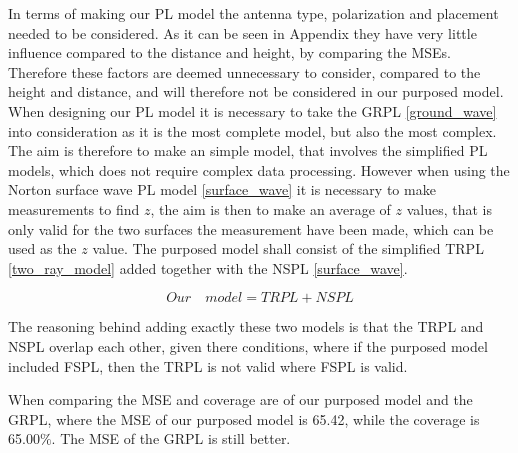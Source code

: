 In terms of making our PL model the antenna type, polarization and placement needed to be considered. As it can be seen in Appendix they have very little influence compared to the distance and height, by comparing the MSEs. Therefore these factors are deemed unnecessary to consider, compared to the height and distance, and will therefore not be considered in our purposed model. When designing our PL model it is necessary to take the GRPL \eqref{ground_wave} into consideration as it is the most complete model, but also the most complex. The aim is therefore to make an simple model, that involves the simplified PL models, which does not require complex data processing. However when using the Norton surface wave PL model \eqref{surface_wave} it is necessary to make measurements to find $z$, the aim is then to make an average of $z$ values, that is only valid for the two surfaces the measurement have been made, which can be used as the $z$ value. The purposed model shall consist of the simplified TRPL \eqref{two_ray_model} added together with the NSPL \eqref{surface_wave}.

\begin{equation}
Our \quad model = TRPL + NSPL
\end{equation}

The reasoning behind adding exactly these two models is that the TRPL and NSPL overlap each other, given there conditions, where if the purposed model included FSPL, then the TRPL is not valid where FSPL is valid. 



When comparing the MSE and coverage are of our purposed model and the GRPL, where the MSE of our purposed model is 65.42, while the coverage is 65.00$\%$. The MSE of the GRPL is still better.  \\



     
